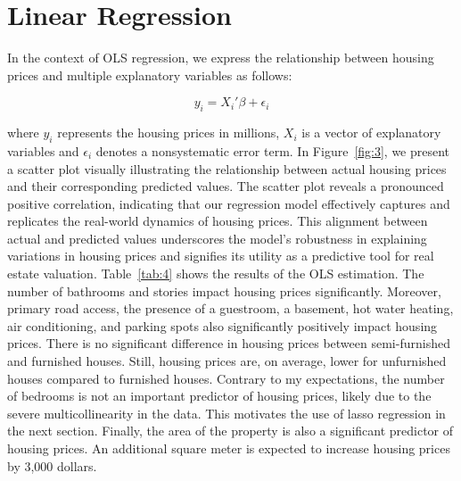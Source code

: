 \documentclass[10pt]{article}
\begin{document}
\section{Linear Regression}

In the context of OLS regression, we express the relationship between housing prices and multiple explanatory variables as follows:

\begin{equation}
y_i = X_{i}'\beta + \epsilon_i
\end{equation}

where $y_i$ represents the housing prices in millions, $X_{i}$ is a vector of explanatory variables and $\epsilon_i$ denotes a nonsystematic error term. In Figure~\ref{fig:3}, we present a scatter plot visually illustrating the relationship between actual housing prices and their corresponding predicted values. The scatter plot reveals a pronounced positive correlation, indicating that our regression model effectively captures and replicates the real-world dynamics of housing prices. This alignment between actual and predicted values underscores the model's robustness in explaining variations in housing prices and signifies its utility as a predictive tool for real estate valuation. Table~\ref{tab:4} shows the results of the OLS estimation. The number of bathrooms and stories impact housing prices significantly. Moreover, primary road access, the presence of a guestroom, a basement, hot water heating, air conditioning, and parking spots also significantly positively impact housing prices. There is no significant difference in housing prices between semi-furnished and furnished houses. Still, housing prices are, on average, lower for unfurnished houses compared to furnished houses. Contrary to my expectations, the number of bedrooms is not an important predictor of housing prices, likely due to the severe multicollinearity in the data. This motivates the use of lasso regression in the next section. Finally, the area of the property is also a significant predictor of housing prices. An additional square meter is expected to increase housing prices by 3,000 dollars. 
\end{document}
